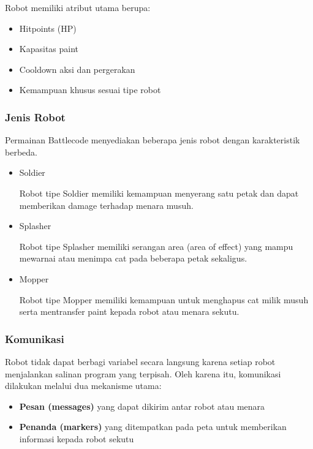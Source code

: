 Robot memiliki atribut utama berupa:

\begin{itemize}
\item Hitpoints (HP)
\item Kapasitas paint
\item Cooldown aksi dan pergerakan
\item Kemampuan khusus sesuai tipe robot
\end{itemize}

\subsubsection{Jenis Robot}

Permainan Battlecode menyediakan beberapa jenis robot dengan karakteristik berbeda.

\begin {itemize}
\item Soldier

Robot tipe Soldier memiliki kemampuan menyerang satu petak dan dapat memberikan damage terhadap menara musuh.

\item Splasher

Robot tipe Splasher memiliki serangan area (area of effect) yang mampu mewarnai atau menimpa cat pada beberapa petak sekaligus.

\item Mopper

Robot tipe Mopper memiliki kemampuan untuk menghapus cat milik musuh serta mentransfer paint kepada robot atau menara sekutu.

\end{itemize}

\subsubsection{Komunikasi}

Robot tidak dapat berbagi variabel secara langsung karena setiap robot menjalankan salinan program yang terpisah. Oleh karena itu, komunikasi dilakukan melalui dua mekanisme utama:

\begin{itemize}
\item \textbf{Pesan (messages)} yang dapat dikirim antar robot atau menara
\item \textbf{Penanda (markers)} yang ditempatkan pada peta untuk memberikan informasi kepada robot sekutu
\end{itemize}

